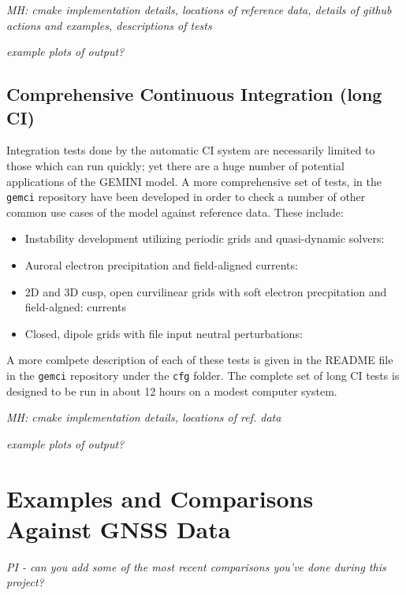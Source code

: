 \documentclass[11pt,letterpaper]{article}
\begin{document}
\emph{MH:  cmake implementation details, locations of reference data, details of github actions and examples, descriptions of tests}

\emph{example plots of output?}

\subsection{Comprehensive Continuous Integration (long CI)}

Integration tests done by the automatic CI system are necessarily limited to those which can run quickly; yet there are a huge number of potential applications of the GEMINI model.  A more comprehensive set of tests, in the \texttt{gemci} repository have been developed in order to check a number of other common use cases of the model against reference data.  These include:
\begin{itemize}
  \item Instability development utilizing periodic grids and quasi-dynamic solvers:  
  \item Auroral electron precipitation and field-aligned currents:  
  \item 2D and 3D cusp, open curvilinear grids with soft electron precpitation and field-algned:   currents
  \item Closed, dipole grids with file input neutral perturbations:  
\end{itemize}
A more comlpete description of each of these tests is given in the README file in the \texttt{gemci} repository under the \texttt{cfg} folder.  The complete set of long CI tests is designed to be run in about 12 hours on a modest computer system.  

\emph{MH:  cmake implementation details, locations of ref. data}

\emph{example plots of output?}



\section{Examples and Comparisons Against GNSS Data}

\emph{PI - can you add some of the most recent comparisons you've done during this project?}



\pagebreak
\setcounter{page}{1}


\end{document}
